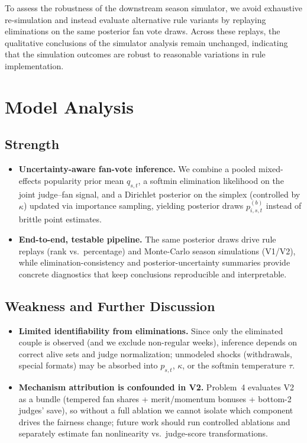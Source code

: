 \documentclass[12pt]{article}
\begin{document}
To assess the robustness of the downstream season simulator, we avoid exhaustive re-simulation and instead evaluate alternative rule variants by replaying eliminations on the same posterior fan vote draws. Across these replays, the qualitative conclusions of the simulator analysis remain unchanged, indicating that the simulation outcomes are robust to reasonable variations in rule implementation.




\section{Model Analysis}

\subsection{Strength}
\begin{itemize}
	\item \textbf{Uncertainty-aware fan-vote inference.} We combine a pooled mixed-effects popularity prior mean $q_{s,t}$, a softmin elimination likelihood on the joint judge--fan signal, and a Dirichlet posterior on the simplex (controlled by $\kappa$) updated via importance sampling, yielding posterior draws $p^{(b)}_{i,s,t}$ instead of brittle point estimates.
	\item \textbf{End-to-end, testable pipeline.} The same posterior draws drive rule replays (rank vs.\ percentage) and Monte-Carlo season simulations (V1/V2), while elimination-consistency and posterior-uncertainty summaries provide concrete diagnostics that keep conclusions reproducible and interpretable.
\end{itemize}

\subsection{Weakness and Further Discussion}
\begin{itemize}
	\item \textbf{Limited identifiability from eliminations.} Since only the eliminated couple is observed (and we exclude non-regular weeks), inference depends on correct alive sets and judge normalization; unmodeled shocks (withdrawals, special formats) may be absorbed into $p_{s,t}$, $\kappa$, or the softmin temperature $\tau$.
	\item \textbf{Mechanism attribution is confounded in V2.} Problem~4 evaluates V2 as a bundle (tempered fan shares + merit/momentum bonuses + bottom-2 judges' save), so without a full ablation we cannot isolate which component drives the fairness change; future work should run controlled ablations and separately estimate fan nonlinearity vs.\ judge-score transformations.
\end{itemize}
\end{document}
